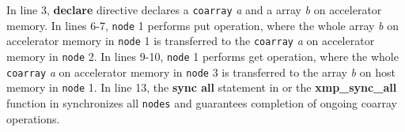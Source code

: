 In line 3,
{\OACC} {\bf declare} directive declares a {\tt coarray} {\it a} and a array {\it b} on accelerator memory.
In lines 6-7,
{\tt node} 1 performs put operation, where
the whole array {\it b} on accelerator memory in {\tt node} 1 is transferred to the {\tt coarray} {\it a} on accelerator memory in {\tt node} 2.
In lines 9-10,
{\tt node} 1 performs get operation, where
the whole {\tt coarray} {\it a} on accelerator memory in {\tt node} 3 is transferred to the array {\it b} on host memory in {\tt node} 1.
In line 13,
the {\bf sync all} statement in {\XACCF} or the {\bf xmp\_sync\_all} function in {\XACCC} synchronizes all {\tt nodes} and guarantees completion of ongoing coarray operations.


